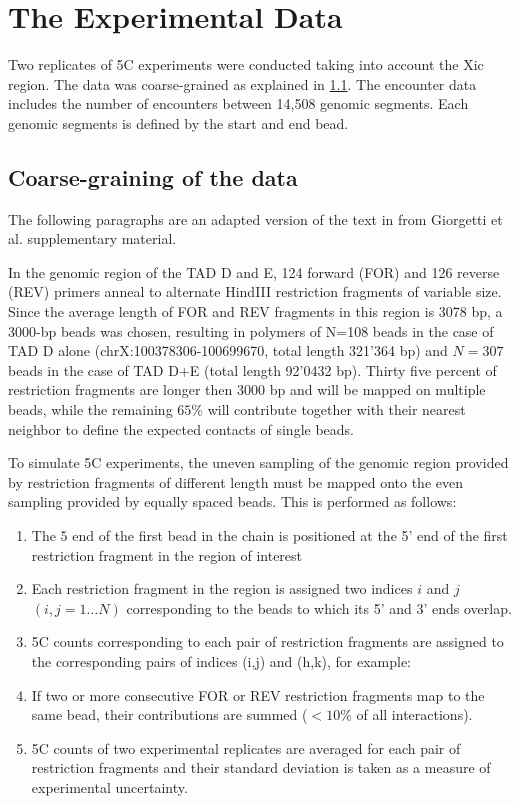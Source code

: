 \documentclass[12pt]{book}
\begin{document}
\section{The Experimental Data}
Two replicates of 5C experiments were conducted taking into account the Xic region. The data was coarse-grained as explained in \ref{coarseGrainingOfEncounterData}.
The encounter data includes the number of encounters between 14,508 genomic segments. Each genomic segments is defined by the start and end bead.

\subsection{Coarse-graining of the data}\label{coarseGrainingOfEncounterData}
The following paragraphs are an adapted version of the text in from Giorgetti et al. \cite{giorgetti2014predictive} supplementary material.

In the genomic region of the TAD D and E, 124 forward (FOR) and 126 reverse (REV) primers anneal to alternate HindIII restriction fragments of variable size. 
Since the average length of FOR and REV fragments in this region is 3078 bp, a 3000-bp beads was chosen, resulting in polymers of N=108 beads in the case of TAD D alone (chrX:100378306-100699670, total length 321’364 bp) and $N=307$ beads in the case of TAD D+E (total length 92’0432 bp). Thirty five percent of restriction fragments are longer then 3000 bp and will be mapped on multiple beads, while the remaining $65\%$ will contribute together with their nearest neighbor to define the expected contacts of single beads.

To simulate 5C experiments, the uneven sampling of the genomic region provided by restriction fragments of different length must be mapped onto the even sampling provided by equally spaced beads. This is performed as follows:

\begin{enumerate}
\item The $5$ end of the first bead in the chain is positioned at the 5’ end of the first restriction fragment in the region of interest 
\item Each restriction fragment in the region is assigned two indices $i$ and $j$ $(i,j=1…N)$ corresponding to the beads to which its 5’ and 3’ ends overlap.
\item 5C counts corresponding to each pair of restriction fragments are assigned to the corresponding pairs of indices (i,j) and (h,k), for example:
\item If two or more consecutive FOR or REV restriction fragments map to the same bead, their contributions are summed ($<10\%$ of all interactions).
\item 5C counts of two experimental replicates are averaged for each pair of restriction fragments and their standard deviation is taken as a measure of experimental uncertainty.
\end{enumerate}
\end{document}
